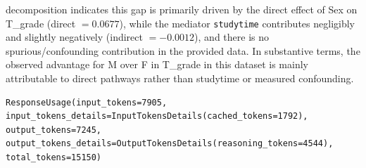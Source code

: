 \documentclass{article}
\begin{document}
decomposition indicates this gap is primarily driven by the direct effect of Sex on T\_grade (direct $= 0.0677$), while the mediator \texttt{studytime} contributes negligibly and slightly negatively (indirect $= -0.0012$), and there is no spurious/confounding contribution in the provided data. In substantive terms, the observed advantage for M over F in T\_grade in this dataset is mainly attributable to direct pathways rather than studytime or measured confounding.

\begin{Verbatim}[breaklines=true]
 ResponseUsage(input_tokens=7905, input_tokens_details=InputTokensDetails(cached_tokens=1792), output_tokens=7245, output_tokens_details=OutputTokensDetails(reasoning_tokens=4544), total_tokens=15150)
\end{Verbatim}
\end{document}
